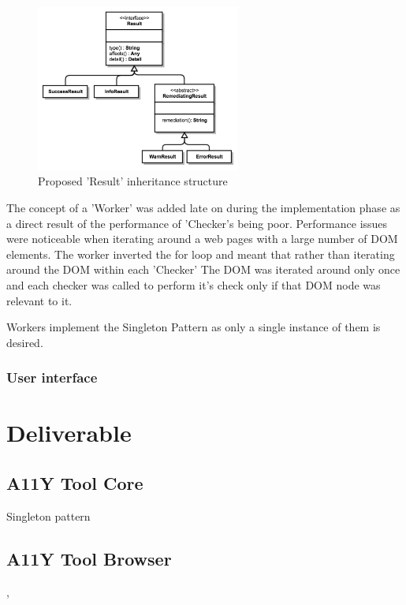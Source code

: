 \begin{figure}[H]
\centering
\includegraphics[width=0.6\textwidth]{figures/a11y_tool_result}
\captionsetup{justification=centering}
\caption{Proposed 'Result' inheritance structure
\label{fig:result_design}}
\end{figure}

The concept of a 'Worker' was added late on during the implementation phase as a
direct result of the performance of 'Checker's being poor. Performance issues
were noticeable when iterating around a web pages with a large number of DOM
elements. The worker inverted the for loop and meant that
rather than iterating around the DOM within each 'Checker' The DOM was
iterated around only once and each checker was called to perform it's check
only if that DOM node was relevant to it.

Workers implement the Singleton Pattern as only a single instance of them is
desired.



\subsubsection{User interface}

\section{Deliverable}


\subsection{A11Y Tool Core}
Singleton pattern



\subsection{A11Y Tool Browser}
,

